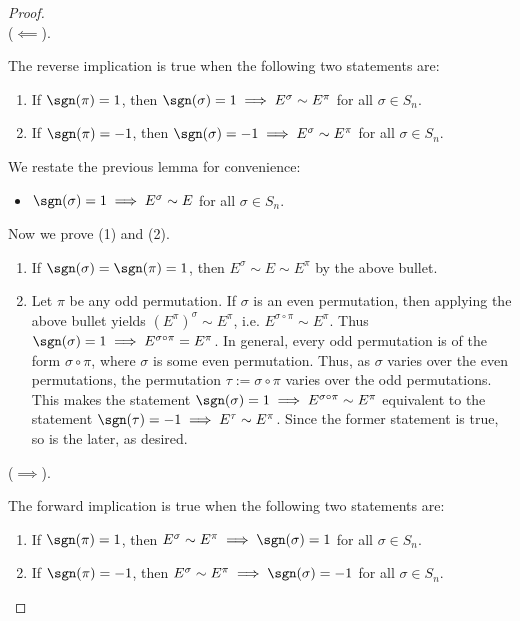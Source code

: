 \begin{proof}
    \mbox{} \\ \indent
    ($\impliedby$).
    
    The reverse implication is true when the following two statements are:
    
    \begin{enumerate}
        \item If $\sgn(\pi) = 1$, then $\sgn(\sigma) = 1 \implies E^\sigma \sim E^\pi$ for all $\sigma \in S_n$.
        \item If $\sgn(\pi) = -1$, then $\sgn(\sigma) = -1 \implies E^\sigma \sim E^\pi$ for all $\sigma \in S_n$.
    \end{enumerate}

    We restate the previous lemma for convenience:

    \begin{itemize}
        \item $\sgn(\sigma) = 1 \implies E^\sigma \sim E$ for all $\sigma \in S_n$.
    \end{itemize}

    Now we prove (1) and (2).

    \begin{enumerate}
        \item If $\sgn(\sigma) = \sgn(\pi) = 1$, then $E^\sigma \sim E \sim E^\pi$ by the above bullet.
        \item Let $\pi$ be any odd permutation. If $\sigma$ is an even permutation, then applying the above bullet yields $(E^\pi)^\sigma \sim E^\pi$, i.e. $E^{\sigma \circ \pi} \sim E^\pi$. Thus $\sgn(\sigma) = 1 \implies E^{\sigma \circ \pi} = E^\pi$. In general, every odd permutation is of the form $\sigma \circ \pi$, where $\sigma$ is some even permutation. Thus, as $\sigma$ varies over the even permutations, the permutation $\tau := \sigma \circ \pi$ varies over the odd permutations. This makes the statement $\sgn(\sigma) = 1 \implies E^{\sigma \circ \pi} \sim E^\pi$ equivalent to the statement $\sgn(\tau) = -1 \implies E^\tau \sim E^\pi$. Since the former statement is true, so is the later, as desired.
    \end{enumerate}

   ($\implies$).

    The forward implication is true when the following two statements are:

    \begin{enumerate}
        \item[3.] If $\sgn(\pi) = 1$, then $E^\sigma \sim E^\pi \implies \sgn(\sigma) = 1$ for all $\sigma \in S_n$.
        \item[4.] If $\sgn(\pi) = -1$, then $E^\sigma \sim E^\pi \implies \sgn(\sigma) = -1$ for all $\sigma \in S_n$.
    \end{enumerate}


\end{proof}
